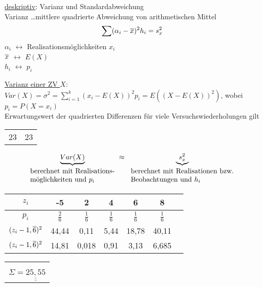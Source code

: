 \underline{deskriptiv}: Varianz und Standardabweichung \\
Varianz \dots mittlere quadrierte Abweichung von arithmetischen Mittel
	$$ \sum (\alpha_i - \overline{x})^2 h_i = s_x^2$$
$\alpha_i$ $\leftrightarrow$ Realisationsmöglichkeiten $x_i$ \\
$\overline{x}$ $\leftrightarrow$ $E(X)$	\\
$h_i$ $\leftrightarrow$ $p_i$

\underline{Varianz einer ZV $X$}: 
	$Var(X) = \sigma^2 = \sum_{i=1}^{k}(x_i - E(X))^2 p_i		
		= E((X-E(X))^2)$, wobei $p_i = P(X=x_i)$\\
Erwartungswert der quadrierten Differenzen für viele Versuchswiederholungen gilt  

\begin{tabular}{p{0.5\linewidth} p{0.5\linewidth}}
\hfill 23 & 23 \hfill\\
\end{tabular}

\def\varA{\mbox{
	\begin{tabular}{@{}l@{}}
		berechnet mit Realisations-\\möglichkeiten und $p_i$
	\end{tabular}
	}
	\hspace{0em}
}
\def\varB{\mbox{
	\begin{tabular}{@{}l@{}}
		berechnet mit Realisationen bzw.\\ Beobachtungen und $h_i$
	\end{tabular}
	}
	\hspace{0em}
}

	$$ \underbrace{Var(X)}_{\varA} \approx \; \underbrace{s_x^2}_{\varB}$$

\begin{tabular}{c | c | c | c | c | c l }
$z_i$	  & -5 & 2 & 4 & 6 & 8\\
\hline   
$p_i$  &  $\frac{2}{6}$  & $\frac{1}{6}$ & $\frac{1}{6}$ & $\frac{1}{6}$ & $\frac{1}{6}$ \\
$(z_i -1,\overline{6})^2$ & 44,44 & 0,11 & 5,44 & 18,78 & 40,11 \\
$(z_i -1,\overline{6})^2$ & 14,81 & 0,018 & 0,91 & 3,13 & 6,685 \\
\end{tabular}
\begin{tabular}{l}
\\ \\ \\
$\Sigma = \underline{\underline{25,55}}$	
\end{tabular}

